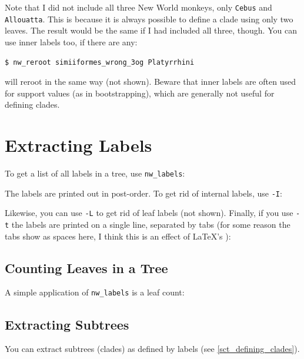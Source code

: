 \documentclass[a4paper,10pt]{report}
\newcommand{\labels}{\texttt{nw\_labels}}
\theoremstyle{definition}
\begin{document}
\noindent{}Note that I did not include all three New World monkeys, only \texttt{Cebus} and \texttt{Allouatta}. This is because it is always possible to define a clade using only two leaves. The result would be the same if I had included all three, though. You can use inner labels too, if there are any:
\begin{verbatim}
$ nw_reroot simiiformes_wrong_3og Platyrrhini
\end{verbatim}
will reroot in the same way (not shown). Beware that inner labels are often used for support values (as in bootstrapping), which are generally not useful for defining clades.

\section{Extracting Labels}
\label{sct_labels}

To get a list of all labels in a tree, use \labels:




\noindent{}The labels are printed out in post-order. To get rid of internal labels, use \texttt{-I}:




\noindent{}Likewise, you can use \texttt{-L} to get rid of leaf labels (not shown). Finally, if you use \texttt{-t} the labels are printed on a single line, separated by tabs (for some reason the tabs show as spaces here, I think this is an effect of \LaTeX{}'s \verb++):




\subsection{Counting Leaves in a Tree}
\label{sct_counting_leaves}

A simple application of \labels{} is a leaf count:




\subsection{Extracting Subtrees}
\label{sct_subtrees}

You can extract subtrees (clades) as defined by labels (see \ref{sct_defining_clades}).
\end{document}
